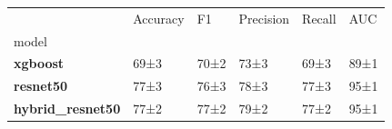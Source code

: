 \begin{tabular}{llllll}
\toprule
 & Accuracy & F1 & Precision & Recall & AUC \\
model &  &  &  &  &  \\
\midrule
\textbf{xgboost} & 69±3 & 70±2 & 73±3 & 69±3 & 89±1 \\
\textbf{resnet50} & 77±3 & 76±3 & 78±3 & 77±3 & 95±1 \\
\textbf{hybrid_resnet50} & 77±2 & 77±2 & 79±2 & 77±2 & 95±1 \\
\bottomrule
\end{tabular}
